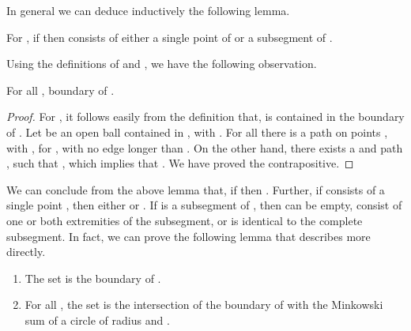 In general we can deduce inductively the following lemma.

\begin{lemma}\label{lem:basic}
For , if  then  consists of either  a single point of  or a subsegment of .
\end{lemma}

Using the definitions of  and , we have the following observation.

\begin{lemma}\label{lem:boundary}\label{subsec:l5}
For all ,   boundary of .
\end{lemma}

\begin{proof} For , it follows easily from the definition that,
   is contained in the boundary of .  Let
   be an open ball contained in , with .  For
  all  there is a path on points ,
  with , for , with no edge longer than
  .  On the other hand, there exists a  and path
  , such that
  , which implies that
  .  We have proved the contrapositive. 
\end{proof}



\noindent We can conclude from the above lemma that, if  then .
Further, if  consists of a single point , then either  or .
If  is a subsegment of , then  can be empty, consist of one or both extremities of the subsegment, or is identical to the complete subsegment.
 In fact, we can prove the following lemma that describes  more directly.

\begin{lemma}\label{subsec:l6}
\begin{enumerate}
    \item The set  is the boundary of .
    \item For all , the set  is the intersection of the boundary of  with the Minkowski sum of a circle of radius  and .
  \end{enumerate}
\end{lemma}

